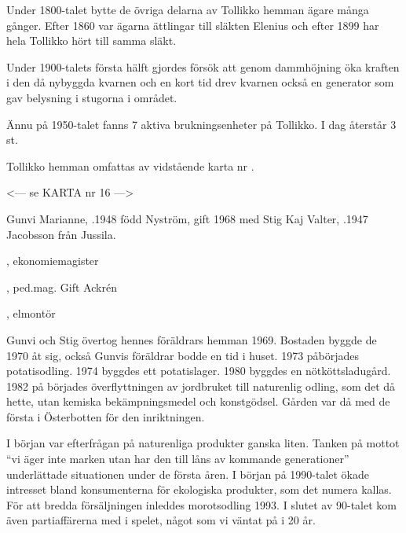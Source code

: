 Under 1800-talet bytte de övriga delarna av Tollikko hemman ägare många gånger. Efter 1860 var ägarna ättlingar till släkten Elenius och efter 1899 har hela Tollikko hört till samma släkt.

Under 1900-talets första hälft gjordes försök att genom dammhöjning öka kraften i den då nybyggda kvarnen och en kort tid drev kvarnen också en generator som gav belysning i stugorna i området.

Ännu på 1950-talet fanns 7 aktiva brukningsenheter på Tollikko. I dag återstår 3 st.

Tollikko hemman omfattas av vidstående karta nr .


<--- se KARTA nr 16 --->


%



%



%
Gunvi Marianne, .1948 född Nyström, gift 1968 med Stig Kaj Valter, .1947 Jacobsson från Jussila.
\begin{jhchildren}
  \item {}, ekonomiemagister
  \item {}, ped.mag. Gift Ackrén
  \item {}, elmontör
\end{jhchildren}
Gunvi och Stig övertog hennes föräldrars hemman 1969. Bostaden 	byggde de 1970 åt sig, också Gunvis föräldrar bodde en tid i huset. 1973 påbörjades potatisodling. 1974 byggdes ett potatislager. 1980 byggdes en nötköttsladugård. 1982 på börjades överflyttningen av jordbruket till naturenlig odling, som det då hette, utan kemiska bekämpningsmedel och konstgödsel. Gården var då med de första i Österbotten för den inriktningen.

I början var efterfrågan på naturenliga produkter ganska liten. Tanken på mottot ``vi äger inte marken utan har den till låns av kommande generationer'' underlättade situationen under de första åren. I början på 1990-talet ökade intresset bland konsumenterna för ekologiska produkter, som det numera kallas. För att bredda försäljningen inleddes morotsodling 1993. I slutet av 90-talet kom även partiaffärerna med i spelet, något som vi väntat på i 20 år.

